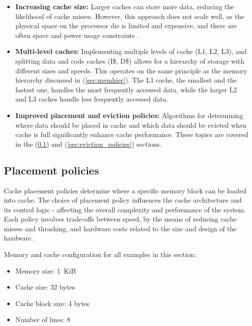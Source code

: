 \begin{itemize}
	\item \textbf{Increasing cache size:} Larger caches can store more data, reducing the likelihood of cache misses. However, this approach does not scale well,
		as the physical space on the processor die is limited and expensive, and there are often space and power usage constraints \cite{Smith1982} \cite{Hill1989}.
	\item \textbf{Multi-level caches:} Implementing multiple levels of cache (L1, L2, L3), and splitting data and code caches (I\$, D\$) allows for a hierarchy of storage with different
		sizes and speeds. This operates on the same principle as the memory hierarchy discussed in (\ref{sec:memhier}). The L1 cache, the smallest and the fastest one, handles the most frequently accessed data,
		while the larger L2 and L3 caches handle less frequently accessed data.
	\item \textbf{Improved placement and eviction policies:} Algorithms for determining where data should be placed in cache and which data should be evicted when cache is full
		significantly enhance cache performance. These topics are covered in the (\ref{sec:placement}) and (\ref{sec:eviction_policies}) sections.
\end{itemize}

%
\subsection{Placement policies} \label{sec:placement}
Cache placement policies determine where a specific memory block can be loaded into
cache. The choice of placement policy influences the cache architecture and
its control logic - affecting the overall complexity and performance of the system.
Each policy involves trade-offs between speed, by the means of reducing cache misses and
thrashing, and hardware costs related to the size and design of the hardware.

\vspace{10px}
\noindent Memory and cache configuration for all examples in this section:
\begin{itemize}
	\item Memory size: 1 KiB
	\item Cache size: 32 bytes
	\item Cache block size: 4 bytes
	\item Number of lines: 8
\end{itemize}

